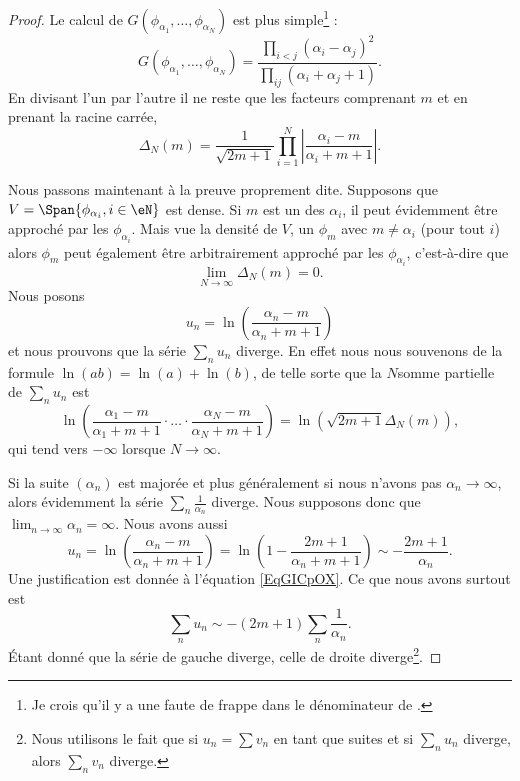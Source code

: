 \begin{proof}
	Le calcul de \( G(\phi_{\alpha_1},\ldots, \phi_{\alpha_N})\) est plus simple\footnote{Je crois qu'il y a une faute de frappe dans le dénominateur de \cite{jqZSyG}.} :
	\begin{equation}
		G(\phi_{\alpha_1},\ldots, \phi_{\alpha_N})=\frac{ \prod_{i<j}(\alpha_i-\alpha_j)^2 }{ \prod_{ij}(\alpha_i+\alpha_j+1) }.
	\end{equation}
	En divisant l'un par l'autre il ne reste que les facteurs comprenant \( m\) et en prenant la racine carrée,
	\begin{equation}    \label{EqANiuNB}
		\Delta_N(m)=\frac{1}{ \sqrt{2m+1} }\prod_{i=1}^N\left| \frac{ \alpha_i-m }{ \alpha_i+m+1 } \right| .
	\end{equation}

	Nous passons maintenant à la preuve proprement dite. Supposons que \( V=\Span\{ \phi_{\alpha_i},i\in \eN \}\) est dense. Si \( m\) est un des \( \alpha_i\), il peut évidemment être approché par les \( \phi_{\alpha_i}\). Mais vue la densité de \( V\), un \( \phi_m\) avec \( m\neq \alpha_i\) (pour tout \( i\)) alors \( \phi_m\) peut également être arbitrairement approché par les \( \phi_{\alpha_i}\), c'est-à-dire que
	\begin{equation}
		\lim_{N\to \infty} \Delta_N(m)=0.
	\end{equation}
	Nous posons
	\begin{equation}
		u_n=\ln\left( \frac{ \alpha_n-m }{ \alpha_n+m+1 } \right)
	\end{equation}
	et nous prouvons que la série \( \sum_nu_n\) diverge. En effet nous nous souvenons de la formule \( \ln(ab)=\ln(a)+\ln(b)\), de telle sorte que la \( N\)\ieme somme partielle de \( \sum_nu_n\) est
	\begin{equation}
		\ln\left( \frac{ \alpha_1-m }{ \alpha_1+m+1 }\cdot\ldots\cdot \frac{ \alpha_N-m }{ \alpha_N+m+1 } \right)=\ln\left( \sqrt{2m+1}\Delta_N(m) \right),
	\end{equation}
	qui tend vers \( -\infty\) lorsque \( N\to \infty\).

	Si la suite \( (\alpha_n)\) est majorée et plus généralement si nous n'avons pas \( \alpha_n\to \infty\), alors évidemment la série \( \sum_n\frac{1}{ \alpha_n }\) diverge. Nous supposons donc que \( \lim_{n\to \infty} \alpha_n=\infty\). Nous avons aussi
	\begin{equation}
		u_n=\ln\left( \frac{ \alpha_n-m }{ \alpha_n+m+1 } \right)=\ln\left( 1-\frac{ 2m+1 }{ \alpha_n+m+1 } \right)\sim-\frac{ 2m+1 }{ \alpha_n }.
	\end{equation}
	Une justification est donnée à l'équation \eqref{EqGICpOX}. Ce que nous avons surtout est
	\begin{equation}
		\sum_n u_n\sim -(2m+1)\sum_n\frac{1}{ \alpha_n }.
	\end{equation}
	Étant donné que la série de gauche diverge, celle de droite diverge\footnote{Nous utilisons le fait que si \( u_n=\sum v_n\) en tant que suites et si \( \sum_nu_n\) diverge, alors \( \sum_nv_n\) diverge.}.


\end{proof}
